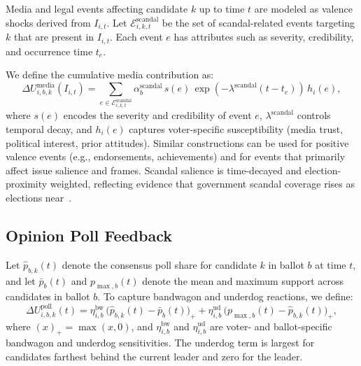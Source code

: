 \documentclass[11pt]{article}
\begin{document}
Media and legal events affecting candidate $k$ up to time $t$ are modeled as valence shocks derived from $I_{i,t}$. Let $\mathcal{E}^{\text{scandal}}_{i,k,t}$ be the set of scandal-related events targeting $k$ that are present in $I_{i,t}$. Each event $e$ has attributes such as severity, credibility, and occurrence time $t_e$.

We define the cumulative media contribution as:
\begin{equation}
\Delta U^{\text{media}}_{i,b,k}(I_{i,t}) = \sum_{e \in \mathcal{E}^{\text{scandal}}_{i,k,t}} \alpha^{\text{scandal}}_b \, s(e) \, \exp(-\lambda^{\text{scandal}} (t - t_e)) \, h_i(e),
\end{equation}
where $s(e)$ encodes the severity and credibility of event $e$, $\lambda^{\text{scandal}}$ controls temporal decay, and $h_i(e)$ captures voter-specific susceptibility (media trust, political interest, prior attitudes). Similar constructions can be used for positive valence events (e.g., endorsements, achievements) and for events that primarily affect issue salience and frames.
Scandal salience is time-decayed and election-proximity weighted, reflecting evidence that government scandal coverage rises as elections near~\cite{garz2019scandals}.

\subsection{Opinion Poll Feedback}

Let $\hat p_{b,k}(t)$ denote the consensus poll share for candidate $k$ in ballot $b$ at time $t$, and let $\bar{p}_b(t)$ and $p_{\max,b}(t)$ denote the mean and maximum support across candidates in ballot $b$. To capture bandwagon and underdog reactions, we define:
\begin{equation}
\Delta U^{\text{poll}}_{i,b,k}(t) = \eta^{\text{bw}}_{i,b} \, \big(\hat p_{b,k}(t) - \bar{p}_b(t)\big)_+ + \eta^{\text{ud}}_{i,b} \, \big(p_{\max,b}(t) - \hat p_{b,k}(t)\big)_+,
\end{equation}
where $(x)_+ = \max(x,0)$, and $\eta^{\text{bw}}_{i,b}$ and $\eta^{\text{ud}}_{i,b}$ are voter- and ballot-specific bandwagon and underdog sensitivities. The underdog term is largest for candidates farthest behind the current leader and zero for the leader.
\end{document}
